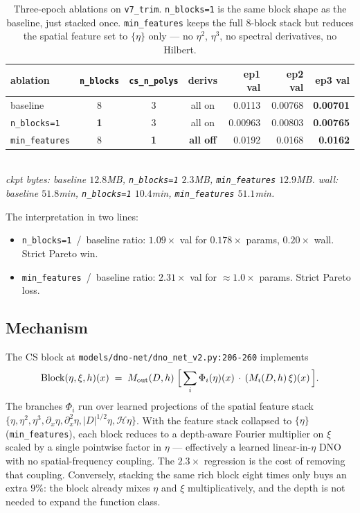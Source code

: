 \documentclass[11pt,letterpaper]{article}
\newcommand{\Hop}{\mathcal{H}}
\begin{document}
\begin{table}[h]
\centering
\small
\begin{tabular}{lcccrrr}
\toprule
ablation & \texttt{n\_blocks} & \texttt{cs\_n\_polys} & derivs & ep1 val & ep2 val & \textbf{ep3 val} \\
\midrule
baseline                & 8 & 3 & all on   & 0.0113  & 0.00768 & \textbf{0.00701} \\
\texttt{n\_blocks=1}    & \textbf{1} & 3 & all on & 0.00963 & 0.00803 & \textbf{0.00765} \\
\texttt{min\_features}  & 8 & \textbf{1} & \textbf{all off} & 0.0192  & 0.0168  & \textbf{0.0162} \\
\bottomrule
\end{tabular}\\[4pt]
\small\textit{ckpt bytes: baseline $12.8$MB, \texttt{n\_blocks=1} $2.3$MB, \texttt{min\_features} $12.9$MB.}\quad
\textit{wall: baseline $51.8$min, \texttt{n\_blocks=1} $10.4$min, \texttt{min\_features} $51.1$min.}
\caption{Three-epoch ablations on \texttt{v7\_trim}. \texttt{n\_blocks=1} is the same block
shape as the baseline, just stacked once. \texttt{min\_features} keeps the full 8-block
stack but reduces the spatial feature set to $\{\eta\}$ only --- no $\eta^{2}$, $\eta^{3}$,
no spectral derivatives, no Hilbert.}
\label{tab:ablation}
\end{table}

The interpretation in two lines:
\begin{itemize}[leftmargin=1.4em,topsep=0pt,itemsep=2pt]
  \item \texttt{n\_blocks=1}~/~baseline ratio: $1.09\!\times$ val for $0.178\!\times$ params,
        $0.20\!\times$ wall. Strict Pareto win.
  \item \texttt{min\_features}~/~baseline ratio: $2.31\!\times$ val for $\approx\!1.0\!\times$
        params. Strict Pareto loss.
\end{itemize}

\subsection{Mechanism}

The CS block at \texttt{models/dno-net/dno\_net\_v2.py:206-260} implements
\begin{equation}
\mathrm{Block}(\eta,\xi,h)(x) \;=\; M_{\mathrm{out}}(D,h)\;\Bigl[\,\sum_{i}\Phi_{i}(\eta)(x)\,\cdot\,(M_{i}(D,h)\,\xi)(x)\,\Bigr].
\label{eq:block}
\end{equation}
The branches $\Phi_{i}$ run over learned projections of the spatial feature stack
$\bigl\{\eta,\eta^{2},\eta^{3},\partial_{x}\eta,\partial_{x}^{2}\eta,|D|^{1/2}\eta,\Hop\eta\bigr\}$.
With the feature stack collapsed to $\{\eta\}$ (\texttt{min\_features}), each block
reduces to a depth-aware Fourier multiplier on $\xi$ scaled by a single pointwise factor in
$\eta$ --- effectively a learned linear-in-$\eta$ DNO with no spatial-frequency coupling.
The $2.3\!\times$ regression is the cost of removing that coupling. Conversely, stacking
the same rich block eight times only buys an extra $9\%$: the block already mixes $\eta$
and $\xi$ multiplicatively, and the depth is not needed to expand the function class.
\end{document}
